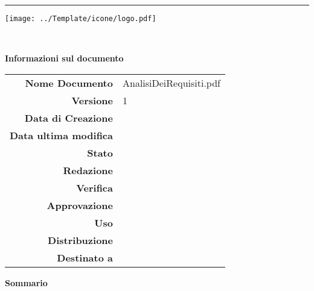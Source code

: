 \begin{center}


\begin{Huge} \textbf{\progetto} \end{Huge}
  \vspace{0.2em}

\hrule
\vspace{-7em}

\texttt{[image: ../Template/icone/logo.pdf]}
\vspace{-10em}

\begin{center} 
  \begin{Huge}
  \textbf{\\ \gruppo} 
  \end{Huge}
\end{center}

\begin{Huge} \documento \end{Huge}

\begin{center}
\textbf{Informazioni sul documento} \\ \vspace{2em}
\small
\begin{tabular}{r|l}
	\textbf{Nome Documento} & AnalisiDeiRequisiti.pdf \\
	\textbf{Versione}	& 1\\
	\textbf{Data di Creazione} & \datacreazione\\
	\textbf{Data ultima modifica} & \datamodifica\\
	\textbf{Stato} & \stato \\
	\textbf{Redazione}	& \redazione\\
	\textbf{Verifica}	& \verifica\\
	\textbf{Approvazione}	& \approvazione\\
	\textbf{Uso}  & \uso\\
	\textbf{Distribuzione} & \gruppo \\
	\textbf{Destinato a}  &  \destinateTo
\end{tabular}
\end{center}
\normalsize

\vspace{4em}

\textbf{Sommario\\} 


\vfill

\end{center}


